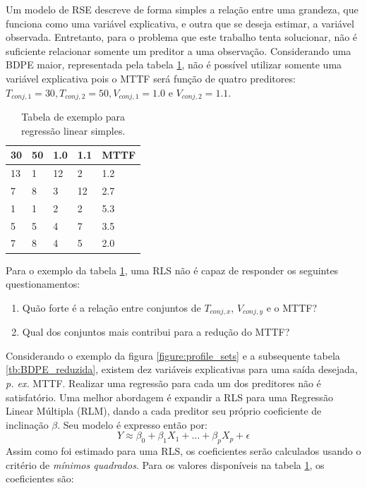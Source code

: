 Um modelo de RSE descreve de forma simples a relação entre uma grandeza, que funciona como uma variável explicativa, e outra que se deseja estimar, a variável observada.
Entretanto, para o problema que este trabalho tenta solucionar, não é suficiente relacionar somente um preditor a uma observação. Considerando uma BDPE maior, representada pela tabela \ref{tb:regressao_simples_exemplo}, não é possível utilizar somente uma variável explicativa pois o MTTF será função de quatro preditores: $T_{conj,1}=30, T_{conj,2}=50, V_{conj,1}=1.0$ e $V_{conj,2}=1.1$.
\begin{table}[H]
	\centering
	\begin{tabular}{@{}l|l|l|l|l@{}}
		\toprule
		30 & 50 & 1.0 & 1.1 & MTTF \\ \midrule
		13 & 1 & 12 & 2 & 1.2 \\
		7 & 8 & 3 & 12 & 2.7 \\
		1 & 1 & 2 & 2 & 5.3 \\
		5 & 5 & 4 & 7 & 3.5 \\		
		7 & 8 & 4 & 5 & 2.0 \\ \bottomrule
	\end{tabular}
	\caption{Tabela de exemplo para regressão linear simples.}
	\label{tb:regressao_simples_exemplo}
\end{table}
Para o exemplo da tabela \ref{tb:regressao_simples_exemplo}, uma RLS não é capaz de responder os seguintes questionamentos:
\begin{enumerate}
	\item Quão forte é a relação entre conjuntos de $T_{conj,x}$, $V_{conj,y}$ e o MTTF?
	\item Qual dos conjuntos mais contribui para a redução do MTTF? 
\end{enumerate}
Considerando o exemplo da figura \ref{figure:profile_sets} e a subsequente tabela \ref{tb:BDPE_reduzida}, existem dez variáveis explicativas para uma saída desejada, \textit{p. ex.} MTTF. Realizar uma regressão para cada um dos preditores não é satisfatório. Uma melhor abordagem é expandir a RLS para uma Regressão Linear Múltipla (RLM), dando a cada preditor seu próprio coeficiente de inclinação $\beta$. Seu modelo é expresso então por:
\begin{equation}
\label{eq:regressao_linear_multipla}
Y \approx \beta_0+\beta_1X_1 +\dots +\beta_pX_p +\epsilon
\end{equation}
Assim como foi estimado para uma RLS, os coeficientes serão calculados usando o critério de \textit{mínimos quadrados}. Para os valores disponíveis na tabela \ref{tb:regressao_simples_exemplo}, os coeficientes são:
